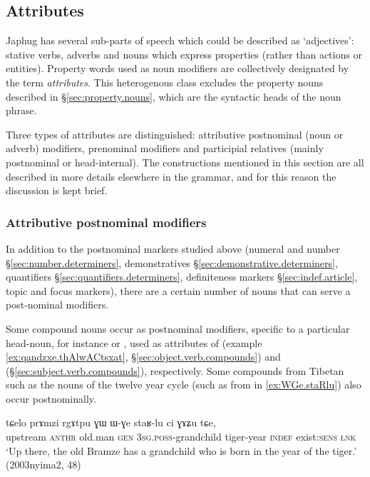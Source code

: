 
\subsection{Attributes} \label{sec:attributes}
Japhug has several sub-parts of speech which could be described as `adjectives': stative verbs, adverbs and nouns which express properties (rather than actions or entities). Property words used as noun modifiers are collectively designated by the term \textit{attributes}. This heterogenous class excludes the property nouns described in §\ref{sec:property.nouns}, which are the syntactic heads of the noun phrase.

Three types of attributes are distinguished: attributive postnominal (noun or adverb) modifiers, prenominal modifiers and participial  relatives (mainly postnominal or head-internal). The constructions mentioned in this section are all described in more details elsewhere in the grammar, and for this reason the discussion is kept brief.

\subsubsection{Attributive postnominal modifiers} \label{ex:attributive.postnominal}
In addition to the postnominal markers studied above (numeral and number §\ref{sec:number.determiners}, demonstratives §\ref{sec:demonstrative.determiners}, quantifiers §\ref{sec:quantifiers.determiners}, definiteness markers §\ref{sec:indef.article}, topic and focus markers), there are a certain number of nouns that can serve a post-nominal modifiers.

Some compound nouns occur as postnominal modifiers, specific to a particular head-noun, for instance  or , used as attributes of   (example \ref{ex:qandzxe.thAlwACtsxat}, §\ref{sec:object.verb.compounds}) and  (§\ref{sec:subject.verb.compounds}), respectively.  Some compounds from Tibetan such as the nouns of the twelve year cycle (such as  from  in \ref{ex:WGe.staRlu}) also occur postnominally.

\begin{exe}
\ex \label{ex:WGe.staRlu}
\gll tɕelo prɤmzi rgɤtpu ɣɯ ɯ-ɣe staʁ-lu ci ɣɤʑu tɕe, \\
upstream  \textsc{anthr} old.man \textsc{gen} \textsc{3sg}.\textsc{poss}-grandchild tiger-year \textsc{indef} exist:\textsc{sens} \textsc{lnk} \\
\glt `Up there, the old Bramze has a grandchild who is born in the year of the tiger.' (2003nyima2, 48)
\end{exe}

